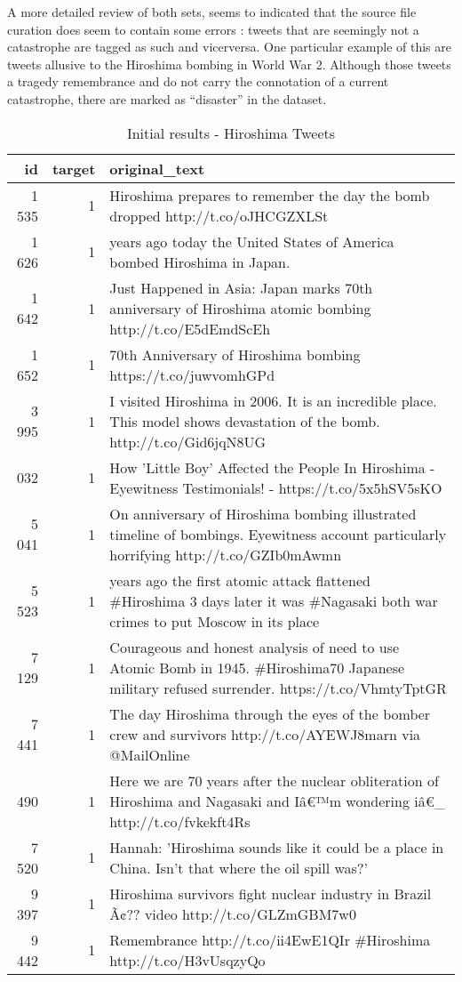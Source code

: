 \documentclass[11pt,]{article}
\begin{document}
A more detailed review of both sets, seems to indicated that the source
file curation does seem to contain some errors : tweets that are
seemingly not a catastrophe are tagged as such and vicerversa. One
particular example of this are tweets allusive to the Hiroshima bombing
in World War 2. Although those tweets a tragedy remembrance and do not
carry the connotation of a current catastrophe, there are marked as
``disaster'' in the dataset.

\begin{table}[H]

\caption{\label{tab:hiroshima_tweets}Initial results - Hiroshima Tweets}
\centering
\begin{tabular}[t]{rr>{\raggedright\arraybackslash}p{30em}}
\toprule
id & target & original\_text\\
\midrule
1 535 & 1 & Hiroshima prepares to remember the day the bomb dropped http://t.co/oJHCGZXLSt\\
1 626 & 1 & 70 years ago today the United States of America bombed Hiroshima in Japan.\\
1 642 & 1 & Just Happened in Asia: Japan marks 70th anniversary of Hiroshima atomic bombing http://t.co/E5dEmdScEh\\
1 652 & 1 & 70th Anniversary of Hiroshima bombing https://t.co/juwvomhGPd\\
3 995 & 1 & I visited Hiroshima in 2006. It is an incredible place. This model shows devastation of the bomb. http://t.co/Gid6jqN8UG\\
\addlinespace
5 032 & 1 & How 'Little Boy' Affected the People In Hiroshima - Eyewitness Testimonials! - https://t.co/5x5hSV5sKO\\
5 041 & 1 & On anniversary of Hiroshima bombing illustrated timeline of bombings. Eyewitness account particularly horrifying http://t.co/GZIb0mAwmn\\
5 523 & 1 & 70 years ago the first atomic attack flattened \#Hiroshima 3 days later it was \#Nagasaki both war crimes to put Moscow in its place\\
7 129 & 1 & Courageous and honest analysis of need to use Atomic Bomb in 1945. \#Hiroshima70 Japanese military refused surrender. https://t.co/VhmtyTptGR\\
7 441 & 1 & The day Hiroshima through the eyes of the bomber crew and survivors http://t.co/AYEWJ8marn via @MailOnline\\
\addlinespace
7 490 & 1 & Here we are 70 years after the nuclear obliteration of Hiroshima and Nagasaki and Iâ€™m wondering iâ€\_ http://t.co/fvkekft4Rs\\
7 520 & 1 & Hannah: 'Hiroshima sounds like it could be a place in China. Isn't that where the oil spill was?'\\
9 397 & 1 & Hiroshima survivors fight nuclear industry in Brazil Ã¢?? video http://t.co/GLZmGBM7w0\\
9 442 & 1 & Remembrance  http://t.co/ii4EwE1QIr \#Hiroshima http://t.co/H3vUsqzyQo\\
\bottomrule
\end{tabular}
\end{table}
\end{document}

